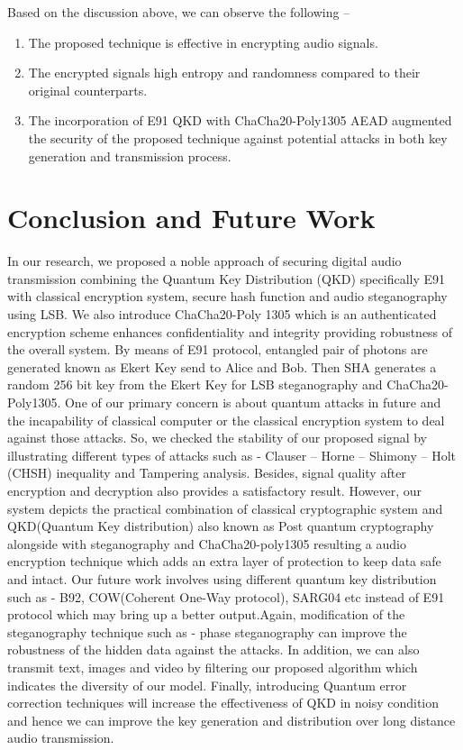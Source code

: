 \documentclass{article}
\begin{document}
Based on the discussion above, we can observe the following --
\begin{enumerate}
    \item The proposed technique is effective in encrypting audio signals.
    \item The encrypted signals high entropy and randomness compared to their original counterparts.
    \item The incorporation of E91 QKD with ChaCha20-Poly1305 AEAD augmented the security of the proposed technique against potential attacks in both key generation and transmission process.
\end{enumerate}
\section{Conclusion and Future Work}
\label{sec:conclusion}
In our research, we proposed a noble approach of securing digital audio transmission combining the Quantum Key Distribution (QKD) specifically E91 with classical encryption system, secure hash function and audio steganography using LSB. We also introduce ChaCha20-Poly 1305 which is an authenticated encryption scheme enhances confidentiality and integrity providing robustness of the overall system. By means of E91 protocol, entangled pair of photons are generated known as Ekert Key send to Alice and Bob. Then SHA generates a random 256 bit key from the Ekert Key for LSB steganography and ChaCha20-Poly1305. One of our primary concern is about quantum attacks in future and the incapability of classical computer or the classical encryption system to deal against those attacks. So, we checked the stability of our proposed signal by illustrating different types of attacks such as - Clauser -- Horne -- Shimony -- Holt (CHSH) inequality and Tampering analysis. Besides, signal quality after encryption and decryption also provides a satisfactory result. However, our system depicts the practical combination of classical cryptographic system and QKD(Quantum Key distribution) also known as Post quantum cryptography alongside with steganography and ChaCha20-poly1305 resulting a audio encryption technique which adds an extra layer of protection to keep data safe and intact. Our future work involves using different quantum key distribution such as - B92, COW(Coherent One-Way protocol), SARG04  etc instead of E91 protocol which may bring up a better output.\cite{nurhadi2018quantum}Again, modification of the steganography technique such as - phase steganography can improve the robustness of the hidden data against the attacks. In addition, we can also transmit text, images and video by filtering our proposed algorithm which indicates the diversity of our model. Finally, introducing Quantum error correction techniques \cite{devitt2013quantum} will increase the effectiveness of QKD in noisy condition \cite{nagata2017quantum} and  hence we can improve the key generation and distribution over long distance audio transmission.


\end{document}
